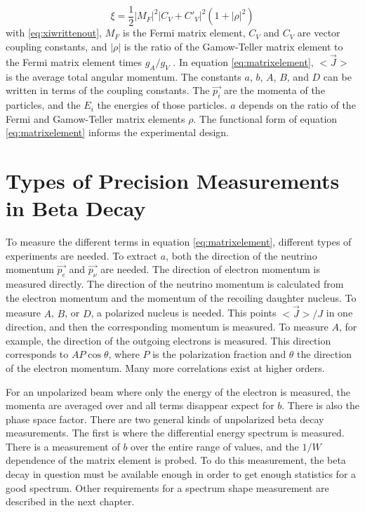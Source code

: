 \documentclass[../MaxHughesThesis.tex]{subfiles}
\begin{document}
\begin{equation}
	\xi = \frac{1}{2} |M_{F}|^{2} |C_{V} + C'_{V}|^{2} (1 + |\rho|^{2})
	\label{eq:xiwrittenout}
\end{equation}
with \ref{eq:xiwrittenout}, $M_{F}$ is the Fermi matrix element, $C_{V}$ and $C_{V}$ are vector coupling constants, and $|\rho|$ is the ratio of the Gamow-Teller matrix element to the Fermi matrix element times $g_{A}/g_{V}$ \cite{Gon19}.
In equation \ref{eq:matrixelement}, $<\vec{J}>$ is the average total angular momentum. 
The constants $a$, $b$, $A$, $B$, and $D$ can be written in terms of the coupling constants.
The $\vec{p_{i}}$ are the momenta of the particles, and the $E_{i}$ the energies of those particles.
$a$ depends on the ratio of the Fermi and Gamow-Teller matrix elements $\rho$.
The functional form of equation \ref{eq:matrixelement} informs the experimental design.

\section{Types of Precision Measurements in Beta Decay}
To measure the different terms in equation \ref{eq:matrixelement}, different types of experiments are needed.
To extract $a$, both the direction of the neutrino momentum $\vec{p_{e}}$ and $\vec{p_{\nu}}$ are needed.  
The direction of electron momentum is measured directly. 
The direction of the neutrino momentum is calculated from the electron momentum and the momentum of the recoiling daughter nucleus. 
To measure $A$, $B$, or $D$, a polarized nucleus is needed.
This points $<\vec{J}>/J$ in one direction, and then the corresponding momentum is measured.
To measure $A$, for example, the direction of the outgoing electrons is measured.
This direction corresponds to $AP\cos{\theta}$, where $P$ is the polarization fraction and $\theta$ the direction of the electron momentum.
Many more correlations exist at higher orders.

For an unpolarized beam where only the energy of the electron is measured, the momenta are averaged over and all terms disappear expect for $b$.
There is also the phase space factor.
There are two general kinds of unpolarized beta decay measurements.
The first is where the differential energy spectrum is measured.
There is a measurement of $b$ over the entire range of values, and the $1/W$ dependence of the matrix element is probed.
To do this measurement, the beta decay in question must be available enough in order to get enough statistics for a good spectrum.
Other requirements for a spectrum shape measurement are described in the next chapter.
\end{document}
